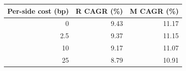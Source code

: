 \begin{tabular}{@{}rrr@{}}\toprule
Per-side cost (bp) & R CAGR (\%) & M CAGR (\%)\\\midrule
0 & 9.43 & 11.17\\
2.5 & 9.37 & 11.15\\
10 & 9.17 & 11.07\\
25 & 8.79 & 10.91\\
\bottomrule
\end{tabular}
